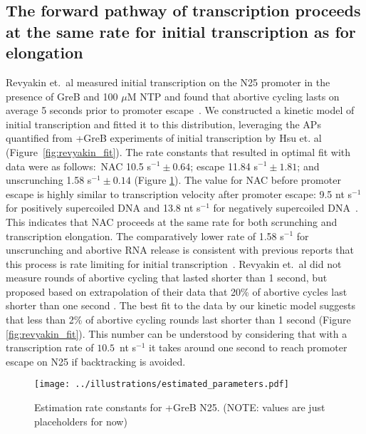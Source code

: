 %
\subsection{The forward pathway of transcription proceeds at the same rate
for initial transcription as for elongation}
Revyakin et.\ al measured initial transcription on the N25 promoter in the
presence of GreB and 100 $\mu$M NTP and found that abortive cycling lasts on
average 5 seconds prior to promoter escape~\cite{revyakin_abortive_2006}. We
constructed a kinetic model of initial transcription and fitted it to this
distribution, leveraging the APs quantified from +GreB experiments of initial
transcription by Hsu et. al~\cite{hsu_initial_2006}
(Figure~\ref{fig:revyakin_fit}). The rate constants that resulted in 
optimal fit with data were as follows:~NAC 10.5 s$^{-1} \pm 0.64$; escape
11.84 s$^{-1} \pm 1.81$; and unscrunching 1.58 s$^{-1} \pm 0.14$ (Figure
\ref{fig:parameter_estimation}). The value for NAC before promoter escape is
highly similar to transcription velocity after promoter escape: 9.5 nt
s$^{-1}$ for positively supercoiled DNA and 13.8 nt s$^{-1}$ for negatively
supercoiled DNA~\cite{revyakin_abortive_2006}. This indicates that NAC
proceeds at the same rate for both scrunching and transcription elongation.
The comparatively lower rate of 1.58 s$^{-1}$ for unscrunching and abortive
RNA release is consistent with previous reports that this process is rate
limiting for initial transcription~\cite{margeat_direct_2006,
revyakin_abortive_2006}. Revyakin et.\ al did not measure rounds of abortive
cycling that lasted shorter than 1 second, but proposed based on extrapolation
of their data that 20\% of abortive cycles last shorter than one second
\cite{revyakin_abortive_2006}. The best fit to the data by our kinetic model
suggests that less than 2\% of abortive cycling rounds last shorter than 1
second (Figure \ref{fig:revyakin_fit}). This number can be understood by
considering that with a transcription rate of $10.5$~nt s$^{-1}$ it takes
around one second to reach promoter escape on N25 if backtracking is
avoided.

\begin{figure}
	\begin{center}
      \texttt{[image: ../illustrations/estimated\_parameters.pdf]}
	\end{center}
    \caption{Estimation rate constants for +GreB N25. (NOTE: values are just
    placeholders for now)}
    \label{fig:parameter_estimation}
\end{figure}

